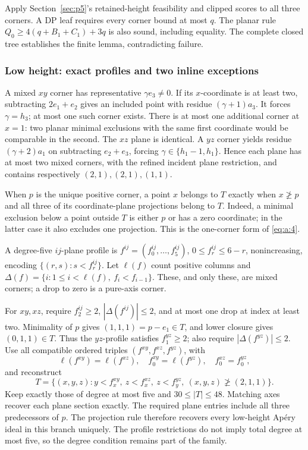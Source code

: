 Apply Section~\ref{sec:p5}'s retained-height feasibility and clipped scores to all
three corners. A DP leaf requires every corner bound at most \(q\).
The planar rule \(Q_0\ge4(q+B_1+C_1)+3q\) is also sound, including equality.
The complete closed tree establishes the finite lemma, contradicting failure.

\subsubsection{Low height: exact profiles and two inline exceptions}

A mixed \(xy\) corner has representative \(\gamma e_3\ne0\).
If its \(x\)-coordinate is at least two, subtracting \(2e_1+e_2\)
gives an included point with residue \((\gamma+1)a_3\).
It forces \(\gamma=h_3\); at most one such corner exists.
There is at most one additional corner at \(x=1\): two planar minimal
exclusions with the same first coordinate would be comparable in the second.
The \(xz\) plane is identical. A \(yz\) corner yields residue
\((\gamma+2)a_1\) on subtracting \(e_2+e_3\), forcing
\(\gamma\in\{h_1-1,h_1\}\).
Hence each plane has at most two mixed corners, with the refined incident
plane restriction, and contains respectively \((2,1),(2,1),(1,1)\).

When \(p\) is the unique positive corner, a point \(x\) belongs to \(T\)
exactly when \(x\not\ge p\) and all three of its coordinate-plane
projections belong to \(T\). Indeed, a minimal exclusion below a point
outside \(T\) is either \(p\) or has a zero coordinate; in the latter case
it also excludes one projection. This is the one-corner form of
\eqref{eq:a:4}.

A degree-five \(ij\)-plane profile is
\(f^{ij}=(f^{ij}_0,\ldots,f^{ij}_5)\),
\(0\le f^{ij}_r\le6-r\), nonincreasing, encoding
\(\{(r,s):s<f^{ij}_r\}\).
Let \(\ell(f)\) count positive columns and
\(\Delta(f)=\{i:1\le i<\ell(f),\ f_i<f_{i-1}\}\).
These, and only these, are mixed corners; a drop to zero is a pure-axis corner.

For \(xy,xz\), require \(f^{ij}_2\ge2\),
\(|\Delta(f^{ij})|\le2\), and at most one drop at index at least two.
Minimality of \(p\) gives \((1,1,1)=p-e_1\in T\), and lower closure gives
\((0,1,1)\in T\). Thus the \(yz\)-profile satisfies
\(f^{yz}_1\ge2\); also require \(|\Delta(f^{yz})|\le2\).
Use all compatible ordered triples \((f^{xy},f^{xz},f^{yz})\), with
\[
\ell(f^{xy})=\ell(f^{xz}),\quad
f^{xy}_0=\ell(f^{yz}),\quad f^{xz}_0=f^{yz}_0,
\]
and reconstruct
\begin{equation}
T=\{(x,y,z):y<f^{xy}_x,\ z<f^{xz}_x,\ z<f^{yz}_y,
\ (x,y,z)\not\ge(2,1,1)\}.
\label{eq:p:18}
\end{equation}
Keep exactly those of degree at most five and \(30\le|T|\le48\).
Matching axes recover each plane section exactly.
The required plane entries include all three predecessors of \(p\).
The projection rule therefore recovers every low-height Ap\'ery ideal in
this branch uniquely.
The profile restrictions do not imply total degree at most five, so the
degree condition remains part of the family.

